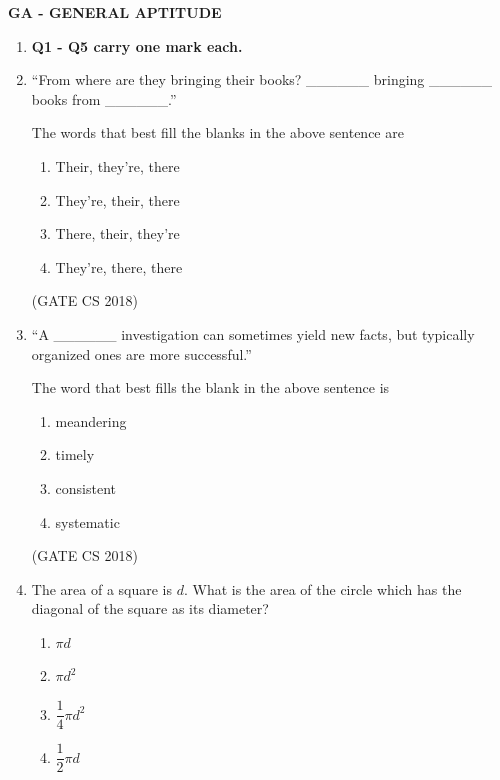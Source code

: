\documentclass[12pt]{article}
\begin{document}
\begin{center}
    {\Large \textbf{GA - GENERAL APTITUDE}}
\end{center}



\begin{enumerate}

\item[] \textbf{Q1 - Q5 carry one mark each.}

\item ``From where are they bringing their books? \_\_\_\_\_\_ bringing \_\_\_\_\_\_ books from \_\_\_\_\_\_.''

The words that best fill the blanks in the above sentence are
\begin{enumerate}
\item Their, they’re, there
\item They’re, their, there
\item There, their, they’re
\item They’re, there, there
\end{enumerate}

(GATE CS 2018)

\item ``A \_\_\_\_\_\_ investigation can sometimes yield new facts, but typically organized ones are more successful.''

The word that best fills the blank in the above sentence is
\begin{multicols}{4}
\begin{enumerate}
\item meandering
\item timely
\item consistent
\item systematic
\end{enumerate}
\end{multicols}

(GATE CS 2018)

\item The area of a square is $d$. What is the area of the circle which has the diagonal of the square as its diameter?

\begin{multicols}{4}
\begin{enumerate}
\item $\pi d$
\item $\pi d^2$
\item $\dfrac{1}{4}\pi d^2$
\item $\dfrac{1}{2}\pi d$
\end{enumerate}
\end{multicols}


\end{enumerate}
\end{document}
